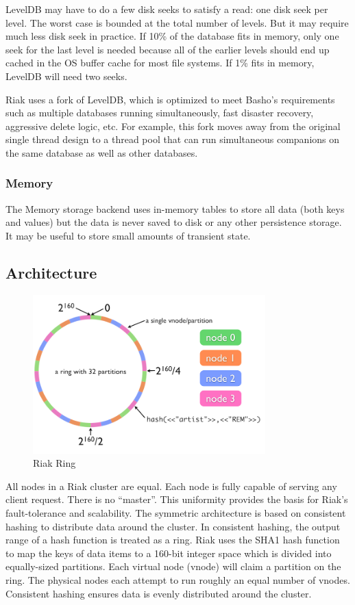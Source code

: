 \documentclass[11pt]{book}
\begin{document}
LevelDB may have to do a few disk seeks to satisfy a read: one disk seek per level. The worst case is bounded at the total number of levels. But it may require much less disk seek in practice. If 10\% of the database fits in memory, only one seek for the last level is needed because all of the earlier levels should end up cached in the OS buffer cache for most file systems. If 1\% fits in memory, LevelDB will need two seeks.

Riak uses a fork of LevelDB, which is optimized to meet Basho's requirements such as multiple databases running simultaneously, fast disaster recovery, aggressive delete logic, etc. For example, this fork moves away from the original single thread design to a thread pool that can run simultaneous companions on the same database as well as other databases.

\subsubsection{Memory}
The Memory storage backend uses in-memory tables to store all data (both keys and values) but the data is never saved to disk or any other persistence storage. It may be useful to store small amounts of transient state.

\subsection{Architecture}

\begin{figure}[t]
\includegraphics[width=0.8\textwidth]{images/riak-ring.png}
\centering
\caption{Riak Ring}
\end{figure}

All nodes in a Riak cluster are equal. Each node is fully capable of serving any client request. There is no ``master''. This uniformity provides the basis for Riak's fault-tolerance and scalability. The symmetric architecture is based on consistent hashing to distribute data around the cluster. In consistent hashing, the output range of a hash function is treated as a ring. Riak uses the SHA1 hash function to map the keys of data items to a 160-bit integer space which is divided into equally-sized partitions. Each virtual node (vnode) will claim a partition on the ring. The physical nodes each attempt to run roughly an equal number of vnodes. Consistent hashing ensures data is evenly distributed around the cluster.
\end{document}
